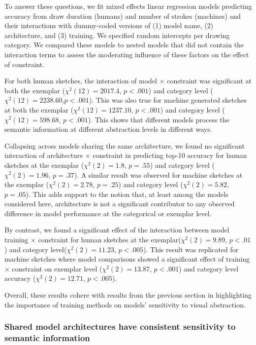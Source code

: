 \documentclass[10pt,letterpaper]{article}
\begin{document}
To answer these questions, we fit mixed effects linear regression models predicting accuracy from draw duration (humans) and number of strokes (machines) and their interactions with dummy-coded versions of (1) model name, (2) architecture, and (3) training. 
We specified random intercepts per drawing category.
We compared these models to nested models that did not contain the interaction terms to assess the moderating influence of these factors on the effect of constraint.

For both human sketches, the interaction of model $\times$ constraint was significant at both the exemplar ($\chi^2(12) = 2017.4$, $p <.001$) and category level ($\chi^2(12) = 2238.60$,$p <.001$).
This was also true for machine generated sketches at both the exemplar ($\chi^2(12) = 1237.10$, $p < .001$) and category level ($\chi^2(12) = 598.68$, $ p <. 001$). 
This shows that different models process the semantic information at different abstraction levels in different ways.

Collapsing across models sharing the same architecture, we found no significant interaction of architecture $\times$ constraint in predicting top-10 accuracy for human sketches at the exemplar ($\chi^2(2) = 1.8$, $p = .55$) and category level ($\chi^2(2) = 1.96$, $p = .37$). 
A similar result was observed for machine sketches at the exemplar ($\chi^2(2) = 2.78$, $p = .25$) and category level ($\chi^2(2) = 5.82$, $p = .05$).
This adds support to the notion that, at least among the models considered here, architecture is not a significant contributor to any observed difference in model performance at the categorical or exemplar level. 

By contrast, we found a significant effect of the interaction between model training $\times$ constraint for human sketches at the exemplar($\chi^2(2) = 9.89$, $p < .01$) and category level($\chi^2(2) = 11.23$, $p < .005$).  This result was replicated for machine sketches where model comparisons showed a significant effect of training $\times$ constraint on exemplar level ($\chi^2(2) = 13.87$, $p < .001$) and category level accuracy ($\chi^2(2) = 12.71$, $p < .005$).

Overall, these results cohere with results from the previous section in highlighting the importance of training methods on models' sensitivity to visual abstraction.

\subsubsection{Shared model architectures have consistent sensitivity to semantic information}
\end{document}

